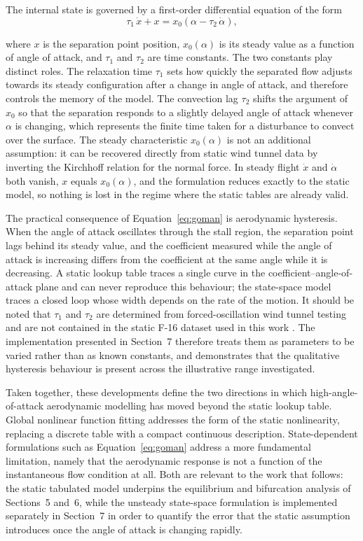 \documentclass[
bindingoffset=5mm,  %
footnoteindent=3mm, %
hyphenation=true    %
]{src/wut-thesis}
\begin{document}
 The internal state is governed by a first-order differential equation of the
 form
 \begin{equation}
 	\tau_{1}\,\dot{x} + x = x_{0}\!\left(\alpha - \tau_{2}\,\dot{\alpha}\right),
 	\label{eq:goman}
 \end{equation}
 
 where $x$ is the separation point position, $x_{0}(\alpha)$ is its steady
 value as a function of angle of attack, and $\tau_{1}$ and $\tau_{2}$ are time
 constants. The two constants play distinct roles. The relaxation time
 $\tau_{1}$ sets how quickly the separated flow adjusts towards its steady
 configuration after a change in angle of attack, and therefore controls the
 memory of the model. The convection lag $\tau_{2}$ shifts the argument of
 $x_{0}$ so that the separation responds to a slightly delayed angle of attack
 whenever $\alpha$ is changing, which represents the finite time taken for a
 disturbance to convect over the surface. The steady characteristic
 $x_{0}(\alpha)$ is not an additional assumption: it can be recovered directly
 from static wind tunnel data by inverting the Kirchhoff relation for the
 normal force. In steady flight $\dot{x}$ and $\dot{\alpha}$ both vanish, $x$
 equals $x_{0}(\alpha)$, and the formulation reduces exactly to the static
 model, so nothing is lost in the regime where the static tables are already
 valid.
 
 The practical consequence of Equation~\eqref{eq:goman} is aerodynamic
 hysteresis. When the angle of attack oscillates through the stall region, the
 separation point lags behind its steady value, and the coefficient measured
 while the angle of attack is increasing differs from the coefficient at the
 same angle while it is decreasing. A static lookup table traces a single curve
 in the coefficient--angle-of-attack plane and can never reproduce this
 behaviour; the state-space model traces a closed loop whose width depends on
 the rate of the motion. It should be noted that $\tau_{1}$ and $\tau_{2}$ are
 determined from forced-oscillation wind tunnel testing and are not contained
 in the static F-16 dataset used in this work \cite{vanoort2006}. The
 implementation presented in Section~7 therefore treats them as parameters to
 be varied rather than as known constants, and demonstrates that the
 qualitative hysteresis behaviour is present across the illustrative range investigated.
 
 Taken together, these developments define the two directions in which
 high-angle-of-attack aerodynamic modelling has moved beyond the static lookup
 table. Global nonlinear function fitting addresses the form of the static
 nonlinearity, replacing a discrete table with a compact continuous
 description. State-dependent formulations such as Equation~\eqref{eq:goman}
 address a more fundamental limitation, namely that the aerodynamic response is
 not a function of the instantaneous flow condition at all. Both are relevant
 to the work that follows: the static tabulated model underpins the equilibrium
 and bifurcation analysis of Sections~5 and~6, while the unsteady state-space
 formulation is implemented separately in Section~7 in order to quantify the
 error that the static assumption introduces once the angle of attack is
 changing rapidly.
 
\end{document}

